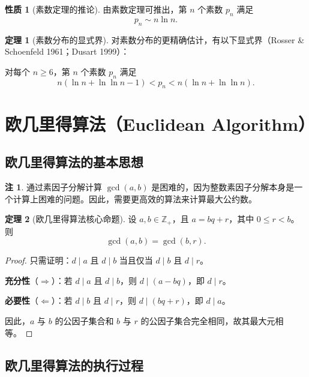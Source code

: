 \documentclass[UTF8,11pt,a4paper]{ctexbook}   %
\theoremstyle{definition}
\newtheorem{theorem}{定理}[section]
\newtheorem{property}{性质}[section]
\newtheorem{remark}{注}[section]
\begin{document}
\begin{property}[素数定理的推论]
由素数定理可推出，第 $n$ 个素数 $p_n$ 满足
\[
p_n \sim n\ln n.
\]
\end{property}

\begin{theorem}[素数分布的显式界]
对素数分布的更精确估计，有以下显式界（Rosser \& Schoenfeld 1961；Dusart 1999）：

对每个 $n\ge 6$，第 $n$ 个素数 $p_n$ 满足
\[
n(\ln n + \ln\ln n - 1) < p_n < n(\ln n + \ln\ln n).
\]
\end{theorem}

\section{欧几里得算法（Euclidean Algorithm）}

\subsection{欧几里得算法的基本思想}

\begin{remark}
通过素因子分解计算 $\gcd(a,b)$ 是困难的，因为整数素因子分解本身是一个计算上困难的问题。因此，需要更高效的算法来计算最大公约数。
\end{remark}

\begin{theorem}[欧几里得算法核心命题]
设 $a,b\in\mathbb{Z}_+$，且 $a = bq + r$，其中 $0\le r < b$。则
\[
\gcd(a,b) = \gcd(b,r).
\]
\end{theorem}

\begin{proof}
只需证明：$d\mid a$ 且 $d\mid b$ 当且仅当 $d\mid b$ 且 $d\mid r$。

\textbf{充分性}（$\Rightarrow$）：若 $d\mid a$ 且 $d\mid b$，则 $d\mid(a-bq)$，即 $d\mid r$。

\textbf{必要性}（$\Leftarrow$）：若 $d\mid b$ 且 $d\mid r$，则 $d\mid(bq+r)$，即 $d\mid a$。

因此，$a$ 与 $b$ 的公因子集合和 $b$ 与 $r$ 的公因子集合完全相同，故其最大元相等。
\end{proof}

\subsection{欧几里得算法的执行过程}
\end{document}
